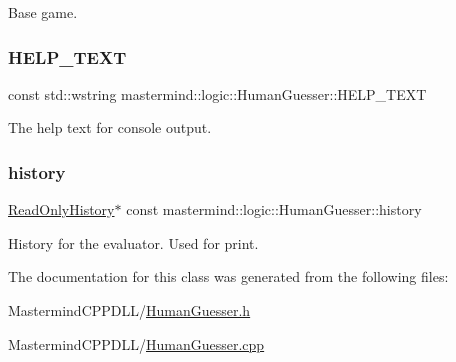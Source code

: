 Base game. 

\hypertarget{classmastermind_1_1logic_1_1_human_guesser_a8df8372c5f59e73e88ad023dd66d590f}{}\label{classmastermind_1_1logic_1_1_human_guesser_a8df8372c5f59e73e88ad023dd66d590f} 
\subsubsection{\texorpdfstring{H\+E\+L\+P\+\_\+\+T\+E\+XT}{HELP\_TEXT}}
{\footnotesize\ttfamily const std\+::wstring mastermind\+::logic\+::\+Human\+Guesser\+::\+H\+E\+L\+P\+\_\+\+T\+E\+XT\hspace{0.3cm}{\ttfamily [private]}}



The help text for console output. 

\hypertarget{classmastermind_1_1logic_1_1_human_guesser_aa6d916119121bed7fbdf7f1af9807b58}{}\label{classmastermind_1_1logic_1_1_human_guesser_aa6d916119121bed7fbdf7f1af9807b58} 
\subsubsection{\texorpdfstring{history}{history}}
{\footnotesize\ttfamily \hyperlink{classmastermind_1_1logic_1_1_read_only_history}{Read\+Only\+History}$\ast$ const mastermind\+::logic\+::\+Human\+Guesser\+::history\hspace{0.3cm}{\ttfamily [private]}}



History for the evaluator. Used for print. 



The documentation for this class was generated from the following files\+:\begin{DoxyCompactItemize}
\item 
Mastermind\+C\+P\+P\+D\+L\+L/\hyperlink{_human_guesser_8h}{Human\+Guesser.\+h}\item 
Mastermind\+C\+P\+P\+D\+L\+L/\hyperlink{_human_guesser_8cpp}{Human\+Guesser.\+cpp}\end{DoxyCompactItemize}
